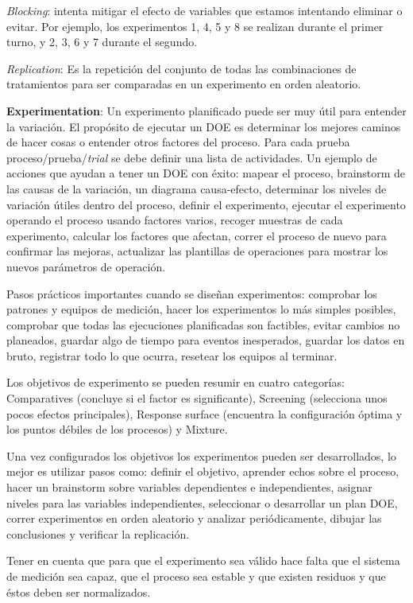 \documentclass[]{article}
\begin{document}
\textit{Blocking}: intenta mitigar el efecto de variables que estamos intentando eliminar o evitar. Por ejemplo, los experimentos 1, 4, 5 y 8 se realizan durante el primer turno, y 2, 3, 6 y 7 durante el segundo.

\textit{Replication}: Es la repetición del conjunto de todas las combinaciones de tratamientos para ser comparadas en un experimento en orden aleatorio.

\textbf{Experimentation}: Un experimento planificado puede ser muy útil para entender la variación. El propósito de ejecutar un DOE es determinar los mejores caminos de hacer cosas o entender otros factores del proceso. Para cada prueba proceso/prueba/\textit{trial} se debe definir una lista de actividades. Un ejemplo de acciones que ayudan a tener un DOE con éxito: mapear el proceso, brainstorm de las causas de la variación, un diagrama causa-efecto, determinar los niveles de variación útiles dentro del proceso, definir el experimento, ejecutar el experimento operando el proceso usando factores varios, recoger muestras de cada experimento, calcular los factores que afectan, correr el proceso de nuevo para confirmar las mejoras, actualizar las plantillas de operaciones para mostrar los nuevos parámetros de operación.

Pasos prácticos importantes cuando se diseñan experimentos: comprobar los patrones y equipos de medición, hacer los experimentos lo más simples posibles, comprobar que todas las ejecuciones planificadas son factibles, evitar cambios no planeados, guardar algo de tiempo para eventos inesperados, guardar los datos en bruto, registrar todo lo que ocurra, resetear los equipos al terminar.

Los objetivos de experimento se pueden resumir en cuatro categorías: Comparatives (concluye si el factor es significante), Screening (selecciona unos pocos efectos principales), Response surface (encuentra la configuración óptima y los puntos débiles de los procesos) y Mixture.

Una vez configurados los objetivos los experimentos pueden ser desarrollados, lo mejor es utilizar pasos como: definir el objetivo, aprender echos sobre el proceso, hacer un brainstorm sobre variables dependientes e independientes, asignar niveles para las variables independientes, seleccionar o desarrollar un plan DOE, correr experimentos en orden aleatorio y analizar periódicamente, dibujar las conclusiones y verificar la replicación.

Tener en cuenta que para que el experimento sea válido hace falta que el sistema de medición sea capaz, que el proceso sea estable y que existen residuos y que éstos deben ser normalizados.
\end{document}
